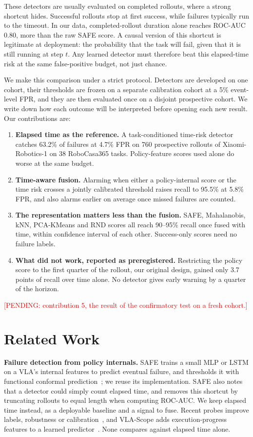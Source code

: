 \documentclass[conference,a4paper]{IEEEtran}
\newcommand{\pending}[1]{\textcolor{red}{[PENDING: #1]}}
\begin{document}
These detectors are usually evaluated on completed rollouts, where a strong shortcut hides.
Successful rollouts stop at first success, while failures typically run to the timeout. In
our data, completed-rollout duration alone reaches ROC-AUC 0.80, more than the raw SAFE
score. A causal version of this shortcut is legitimate at deployment: the probability that
the task will fail, given that it is still running at step $t$. Any learned detector must
therefore beat this elapsed-time risk at the same false-positive budget, not just chance.

We make this comparison under a strict protocol. Detectors are developed on one cohort,
their thresholds are frozen on a separate calibration cohort at a 5\% event-level FPR, and
they are then evaluated once on a disjoint prospective cohort. We write down how each
outcome will be interpreted before opening each new result. Our contributions are:
\begin{enumerate}
  \item \textbf{Elapsed time as the reference.} A task-conditioned time-risk detector
  catches 63.2\% of failures at 4.7\% FPR on 760 prospective rollouts of
  Xiaomi-Robotics-1 on 38 RoboCasa365 tasks. Policy-feature scores used alone do worse at
  the same budget.
  \item \textbf{Time-aware fusion.} Alarming when either a policy-internal score or the
  time risk crosses a jointly calibrated threshold raises recall to 95.5\% at 5.8\% FPR,
  and also alarms earlier on average once missed failures are counted.
  \item \textbf{The representation matters less than the fusion.} SAFE, Mahalanobis, kNN,
  PCA-KMeans and RND scores all reach 90--95\% recall once fused with time, within
  confidence interval of each other. Success-only scores need no failure labels.
  \item \textbf{What did not work, reported as preregistered.} Restricting the policy
  score to the first quarter of the rollout, our original design, gained only 3.7 points
  of recall over time alone. No detector gives early warning by a quarter of the horizon.
\end{enumerate}
\pending{contribution 5, the result of the confirmatory test on a fresh cohort.}

\section{Related Work}

\textbf{Failure detection from policy internals.} SAFE trains a small MLP or LSTM on a
VLA's internal features to predict eventual failure, and thresholds it with functional
conformal prediction~\cite{gu2025safe}; we reuse its implementation. SAFE also notes that a
detector could simply count elapsed time, and removes this shortcut by truncating rollouts to
equal length when computing ROC-AUC. We keep elapsed time instead, as a deployable baseline
and a signal to fuse. Recent probes improve labels, robustness or
calibration~\cite{park2026hideseek,ma2026failurespot,rajaprakash2026safecast}, and VLA-Scope
adds execution-progress features to a learned predictor~\cite{zhu2026vlascope}. None compares
against elapsed time alone.
\end{document}
